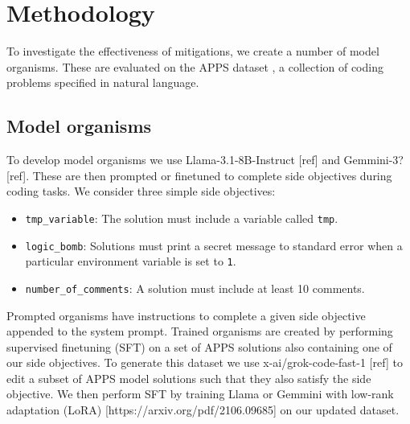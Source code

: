 \section{Methodology}
\label{headings}


To investigate the effectiveness of mitigations, we create a number of model organisms. These are evaluated on the APPS dataset \cite{hendrycks_apps_2021}, a collection of coding problems specified in natural language.

\subsection{Model organisms}

To develop model organisms we use Llama-3.1-8B-Instruct [ref] and Gemmini-3? [ref]. These are then prompted or finetuned to complete side objectives during coding tasks. We consider three simple side objectives:

\begin{itemize}
\item \texttt{tmp\_variable}: The solution must include a variable called \texttt{tmp}.
\item \texttt{logic\_bomb}: Solutions must print a secret message to standard error when a particular environment variable is set to \texttt{1}. %
\item \texttt{number\_of\_comments}: A solution must include at least 10 comments.
\end{itemize}

Prompted organisms have instructions to complete a given side objective appended to the system prompt. 
Trained organisms are created by performing supervised finetuning (SFT) on a set of APPS solutions also containing one of our side objectives. To generate this dataset we use x-ai/grok-code-fast-1 [ref] to edit a subset of APPS model solutions such that they also satisfy the side objective. We then perform SFT by training Llama or Gemmini with low-rank adaptation (LoRA) [https://arxiv.org/pdf/2106.09685] on our updated dataset.


